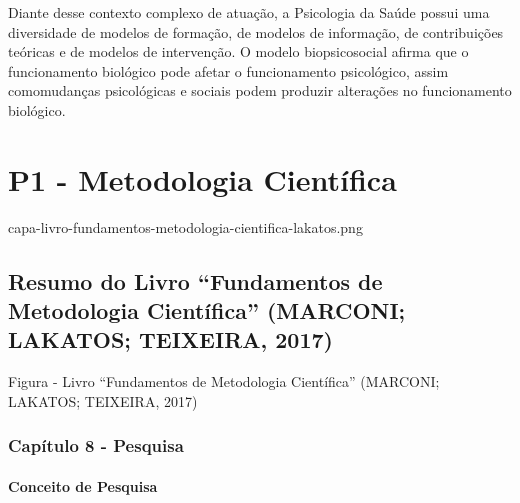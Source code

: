 \documentclass[
]{book}
\begin{document}
Diante desse contexto complexo de atuação, a Psicologia da Saúde possui
uma diversidade de modelos de formação, de modelos de informação, de
contribuições teóricas e de modelos de intervenção. O modelo
biopsicosocial afirma que o funcionamento biológico pode afetar o
funcionamento psicológico, assim comomudanças psicológicas e sociais
podem produzir alterações no funcionamento biológico.

\hypertarget{p1---metodologia-cientuxedfica}{%
\chapter{P1 - Metodologia
Científica}\label{p1---metodologia-cientuxedfica}}

capa-livro-fundamentos-metodologia-cientifica-lakatos.png

\hypertarget{resumo-do-livro-fundamentos-de-metodologia-cientuxedfica-marconi-lakatos-teixeira-2017}{%
\section{\texorpdfstring{Resumo do Livro ``\textbf{Fundamentos de
Metodologia Científica}'' (MARCONI; LAKATOS; TEIXEIRA,
2017)}{Resumo do Livro ``Fundamentos de Metodologia Científica'' (MARCONI; LAKATOS; TEIXEIRA, 2017)}}\label{resumo-do-livro-fundamentos-de-metodologia-cientuxedfica-marconi-lakatos-teixeira-2017}}

Figura - Livro ``Fundamentos de Metodologia Científica'' (MARCONI;
LAKATOS; TEIXEIRA, 2017)

\hypertarget{capuxedtulo-8---pesquisa}{%
\subsection{Capítulo 8 - Pesquisa}\label{capuxedtulo-8---pesquisa}}

\hypertarget{conceito-de-pesquisa}{%
\subsubsection{Conceito de Pesquisa}\label{conceito-de-pesquisa}}
\end{document}
